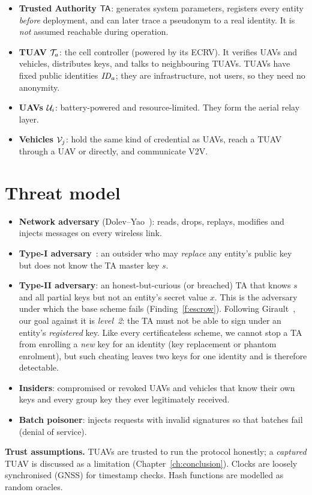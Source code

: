 \begin{itemize}
  \item \textbf{\textcolor{deep}{Trusted Authority $\mathsf{TA}$}}: generates system parameters, registers every entity \emph{before} deployment, and can
        later trace a pseudonym to a real identity. It is \emph{not} assumed reachable during operation.
  \item \textbf{\textcolor{hoc}{TUAV $\mathcal{T}_a$}}: the cell controller (powered by its ECRV). It verifies UAVs and vehicles, distributes keys, and talks to
        neighbouring TUAVs. TUAVs have fixed public identities $\mathit{ID}_a$; they are infrastructure, not users, so they need no anonymity.
  \item \textbf{\textcolor{uavc}{UAVs $\mathcal{U}_i$}}: battery-powered and resource-limited. They form the aerial relay layer.
  \item \textbf{\textcolor{vehc}{Vehicles $\mathcal{V}_j$}}: hold the same kind of credential as UAVs, reach a TUAV through a UAV or directly, and communicate V2V.
\end{itemize}

\section{Threat model}
\begin{itemize}
  \item \textbf{Network adversary} (Dolev--Yao~\cite{dolevyao}): reads, drops, replays, modifies and injects messages on every wireless link.
  \item \textbf{Type-I adversary}~\cite{alriyami}: an outsider who may \emph{replace} any entity's public key but does not know the TA master key $s$.
  \item \textbf{Type-II adversary}: an honest-but-curious (or breached) TA that knows $s$ and all partial keys but not an entity's secret value $x$.
        This is the adversary under which the base scheme fails (Finding~\ref{f:escrow}). Following Girault~\cite{girault}, our goal against it is
        \emph{level~2}: the TA must not be able to sign under an entity's \emph{registered} key. Like every certificateless scheme, we cannot stop a TA from
        enrolling a \emph{new} key for an identity (key replacement or phantom enrolment), but such cheating leaves two keys for one identity and is therefore detectable.
  \item \textbf{Insiders}: compromised or revoked UAVs and vehicles that know their own keys and every group key they ever legitimately received.
  \item \textbf{Batch poisoner}: injects requests with invalid signatures so that batches fail (denial of service).
\end{itemize}
\textbf{Trust assumptions.} TUAVs are trusted to run the protocol honestly; a \emph{captured} TUAV is discussed as a limitation
(Chapter~\ref{ch:conclusion}). Clocks are loosely synchronised (GNSS) for timestamp checks. Hash functions are modelled as random oracles.

